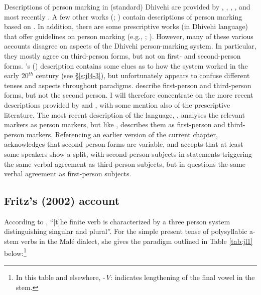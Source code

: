 \documentclass[output=paper]{langsci/langscibook}
\begin{document}
Descriptions of person marking in (standard) Dhivehi are provided by \cite{Geiger1919}, \cite{Wijesundera1988}, \cite{Cain2000}, \cite{Fritz2002}, and most recently \cite{Gnanadesikan2017}. A few other works (\citealt{CainGair2000}; \citealt{Maumoon2002}) contain descriptions of person marking based on \cite{Cain2000}. In addition, there are some prescriptive works (in Dhivehi language) that offer guidelines on person marking (e.g., \citealt{Ahmad1970}; \citealt{Saudiq2012}). However, many of these various accounts disagree on aspects of the Dhivehi person-marking system.  In particular, they mostly agree on third-person forms, but not on first- and second-person forms. \citeauthor{Geiger1919}’s (\citeyear{Geiger1919}) description contains some clues as to how the system worked in the early 20$^{th}$ century (see §‎\ref{s:jl4-3}), but unfortunately appears to confuse different tenses and aspects throughout paradigms. \cite{Wijesundera1988} describe first-person and third-person forms, but not the second person. I will therefore concentrate on the more recent descriptions provided by \cite{CainGair2000} and \cite{Fritz2002}, with some mention also of the prescriptive literature. The most recent description of the language, \cite{Gnanadesikan2017}, analyses the relevant markers as person markers, but like \citeauthor{Wijesundera1988}, describes them as first-person and third-person markers. Referencing an earlier version of the current chapter, \cite[138]{Gnanadesikan2017} acknowledges that second-person forms are variable, and accepts that at least some speakers show a split, with second-person subjects in statements triggering the same verbal agreement as third-person subjects, but in questions the same verbal agreement as first-person subjects.

\subsection{Fritz’s (2002) account}\label{s:jl2-1}

According to \cite[166]{Fritz2002}, “[t]he finite verb is characterized by a three person system distinguishing singular and plural”. For the simple present tense of polysyllabic a-stem verbs in the Malé dialect, she gives the paradigm outlined in Table \ref{tab:jl1} below:\footnote{ In this table and elsewhere, -\textit{V}: indicates lengthening of the final vowel in the stem.}
\end{document}
